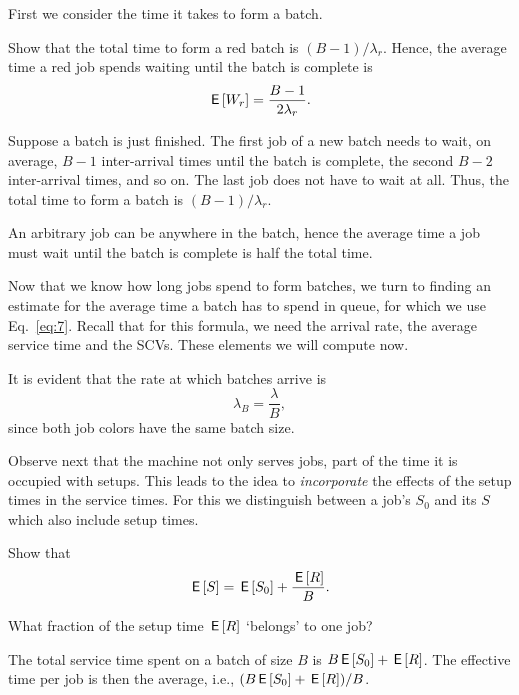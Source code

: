 First we consider the time it takes to form a batch. 
\begin{exercise}[\faFlask]\label{ex:48}
  Show that the total time to form a red batch is $(B-1)/\lambda_r$. Hence, the average time a red job spends waiting until the batch is complete is
\begin{equation*}
  \,\mathsf{E}\left[W_r\right] = \frac{B-1}{2\lambda_r}.
\end{equation*}
\begin{solution}
  Suppose a batch is just finished. The first job of a new batch needs to wait, on average, $B-1$  inter-arrival times until the batch is complete, the second $B-2$ inter-arrival times, and so on. The last job does not have to wait at all. Thus, the total time to form a batch is $(B-1)/\lambda_r$. 

An arbitrary job can be anywhere in the batch, hence the average time a job must wait until the batch is complete is half the total time. 
\end{solution}
\end{exercise}

Now that we know how long jobs spend to form batches, we turn to finding an estimate for the average time a batch has to spend in queue, for which we use Eq.~\eqref{eq:7}. Recall that for  this formula, we need the arrival rate, the average service time and the SCVs. These elements we will compute now. 

It is evident that the  rate at which batches arrive is 
\begin{equation*}
  \lambda_B = \frac \lambda B,
\end{equation*}
since both job colors have the same batch size.  

Observe next that the machine not only  serves jobs, part of the time it is  occupied with setups. This leads to the idea to  \emph{incorporate} the effects of the setup times in the service times. For this we distinguish between a job's  $S_0$  and its  $S$ which also include setup times. 

\begin{exercise}[\faFlask]
  Show that
  \begin{equation*}
    \,\mathsf{E}\left[S\right] = \,\mathsf{E}\left[S_0\right] + \frac{\,\mathsf{E}\left[R\right]} B.
  \end{equation*}
  \begin{hint}
    What fraction of the setup time $\,\mathsf{E}\left[R\right]$ `belongs' to one job?
  \end{hint}
  \begin{solution}
    The total service time spent on a batch of size $B$ is $B \,\mathsf{E}\left[S_0\right] + \,\mathsf{E}\left[R\right]$. The effective time per job is then the average, i.e.,  $(B \,\mathsf{E}\left[S_0\right]+\,\mathsf{E}\left[R\right])/B$. 
  \end{solution}
\end{exercise}

